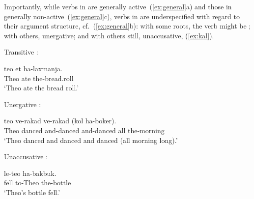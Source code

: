 \begin{exe}
\begin{xlist}
\begin{exe}
\begin{exe}
\begin{exe}
\begin{exe}
\begin{xlist}
\begin{exe}
\begin{xlist}
\begin{xlist}
\begin{xlist}
\begin{exe}
\begin{xlist}
\begin{exe}
\begin{exe}
\begin{xlist}
\begin{exe}
\begin{xlist}
\begin{exe}
\begin{exe}
\begin{xlist}
\begin{exe}
\begin{xlist}
\begin{exe}
\begin{xlist}
\begin{exe}
\begin{exe}
\begin{xlist}
\begin{exe}
\begin{exe}
\begin{xlist}
\begin{exe}
\begin{xlist}
\begin{exe}
\begin{xlist}
\begin{xlist}
\begin{exe}
\begin{exe}
\begin{xlist}
\begin{exe}
\begin{xlist}
\begin{exe}
\begin{xlist}
\begin{exe}
\begin{xlist}
\begin{exe}
\begin{exe}
\begin{exe}
\begin{exe}
Importantly, while verbs in {\thif} are generally active~(\ref{ex:general}a) and those in {\tnif} generally non-active~(\ref{ex:general}c), verbs in {\tkal} are underspecified with regard to their argument structure, cf.~(\ref{ex:general}b): with some roots, the verb might be ; with others, unergative; and with others still, unaccusative, (\ref{ex:kal}).
 \begin{exe}
 \ex \label{ex:kal} 
 \begin{xlist} 
 	\ex  Transitive {\tkal}: 
	
 		\gll  teo  et ha-laxmanja.\\
 		  Theo ate  the-bread.roll\\
 		\glt `Theo ate the bread roll.' 
	

 	\ex  Unergative {\tkal}: 
	
 		\gll  teo  ve-rakad ve-rakad (kol ha-boker).\\
 		  Theo danced and-danced and-danced all the-morning\\
 		\glt `Theo danced and danced and danced (all morning long).' 
	

 	\ex  Unaccusative {\tkal}: 
	
 		\gll  {} le-teo ha-bakbuk.\\
 		  fell to-Theo the-bottle\\
 		\glt `Theo's bottle fell.' 
	
	
 \z
\z 


\end{xlist}
\end{exe}
\end{exe}
\end{exe}
\end{exe}
\end{exe}
\end{xlist}
\end{exe}
\end{xlist}
\end{exe}
\end{xlist}
\end{exe}
\end{xlist}
\end{exe}
\end{exe}
\end{xlist}
\end{xlist}
\end{exe}
\end{xlist}
\end{exe}
\end{xlist}
\end{exe}
\end{exe}
\end{xlist}
\end{exe}
\end{exe}
\end{xlist}
\end{exe}
\end{xlist}
\end{exe}
\end{xlist}
\end{exe}
\end{exe}
\end{xlist}
\end{exe}
\end{xlist}
\end{exe}
\end{exe}
\end{xlist}
\end{exe}
\end{xlist}
\end{xlist}
\end{xlist}
\end{exe}
\end{xlist}
\end{exe}
\end{exe}
\end{exe}
\end{exe}
\end{xlist}
\end{exe}
